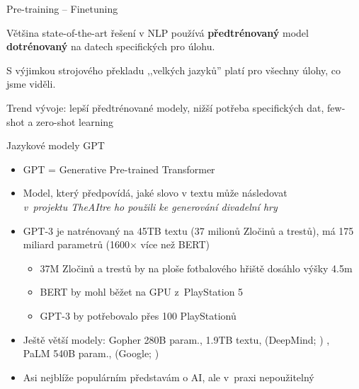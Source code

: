 \documentclass[aspectratio=169,dvipsnames]{beamer}
\begin{document}
\begin{frame}{Pre-training -- Finetuning}

    \centering

    {\huge
		Většina state-of-the-art řešení v NLP používá \textbf{předtrénovaný} model
		\textbf{dotrénovaný} na datech specifických pro úlohu.}

    \vspace{30pt}

    S výjimkou strojového překladu ,,velkých jazyků'' platí pro všechny úlohy,
    co jsme viděli.

    \vspace{10pt}

	Trend vývoje: lepší předtrénované modely, nižší potřeba specifických dat,
		few-shot a zero-shot learning

\end{frame}


\begin{frame}{Jazykové modely GPT}

    \begin{itemize}[<+->]

        \item GPT = Generative Pre-trained Transformer

        \item Model, který předpovídá, jaké slovo v textu může následovat \\
            \it v~projektu TheAItre ho použili ke generování divadelní hry

        \item GPT-3 je natrénovaný na 45TB textu (37 milionů Zločinů a trestů),
            má 175 miliard parametrů (1600$\times$ více než BERT)

            \begin{itemize}[<+->]

                \item 37M Zločinů a trestů by na ploše fotbalového hřiště
                    dosáhlo výšky 4.5m

                \item BERT by mohl běžet na GPU z~PlayStation 5

                \item GPT-3 by potřebovalo přes 100 PlayStationů

            \end{itemize}

	\item Ještě větší modely: Gopher 280B param., 1.9TB textu,  {\small (DeepMind; \citealp{deepmind2021gopher})} , \\ \quad  PaLM 540B param.,  {\small (Google;  \citealp{google2022palm})}

            \item Asi nejblíže populárním představám o AI, ale v~praxi nepoužitelný

    \end{itemize}

\end{frame}
\end{document}
